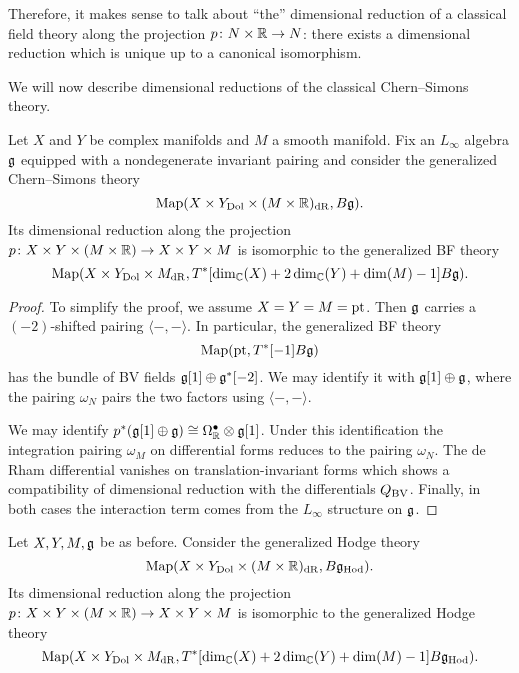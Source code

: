 \documentclass[10pt, oneside]{article}
\newcommand{\Hod}{\mathrm{Hod}}
\begin{document}
\begin{remark}
Therefore, it makes sense to talk about ``the'' dimensional reduction of a classical field theory along the projection $p \colon N \times \mathbb R \to N$: there exists a dimensional reduction which is unique up to a canonical isomorphism.
\end{remark}

We will now describe dimensional reductions of the classical Chern--Simons theory.

\begin{prop} \label{CS_to_BF_diml_red_prop}
Let $X$ and $Y$ be complex manifolds and $M$ a smooth manifold. Fix an $L_\infty$ algebra $\mathfrak g$ equipped with a nondegenerate invariant pairing and consider the generalized Chern--Simons theory
\[\operatorname{Map}(X\times Y_{\mathrm{Dol}}\times (M\times \mathbb R)_{\mathrm{dR}}, B\mathfrak g).\]
Its dimensional reduction along the projection $p\colon X\times Y\times (M\times \mathbb R)\rightarrow X\times Y\times M$ is isomorphic to the generalized BF theory
\[\operatorname{Map}(X\times Y_{\mathrm{Dol}}\times M_{\mathrm{dR}}, T^*[\dim_\mathbb C(X) + 2\dim_\mathbb C(Y) + \dim(M) - 1] B\mathfrak g).\]
\end{prop}

\begin{proof}
To simplify the proof, we assume $X=Y=M=\operatorname{pt}$. Then $\mathfrak g$ carries a $(-2)$-shifted pairing $\langle-,-\rangle$. In particular, the generalized BF theory
\[\operatorname{Map}(\operatorname{pt}, T^*[-1] B \mathfrak g)\]
has the bundle of BV fields $\mathfrak g[1] \oplus \mathfrak g^*[-2]$. We may identify it with $\mathfrak g[1]\oplus \mathfrak g$, where the pairing $\omega_N$ pairs the two factors using $\langle-,-\rangle$.

We may identify $p^*(\mathfrak g[1]\oplus \mathfrak g)\cong \Omega^\bullet_{\mathbb R}\otimes \mathfrak g[1]$. Under this identification the integration pairing $\omega_M$ on differential forms reduces to the pairing $\omega_N$. The de Rham differential vanishes on translation-invariant forms which shows a compatibility of dimensional reduction with the differentials $Q_{\mathrm{BV}}$. Finally, in both cases the interaction term comes from the $L_\infty$ structure on $\mathfrak g$.
\end{proof}

\begin{cor}
Let $X, Y, M, \mathfrak g$ be as before. Consider the generalized Hodge theory
\[\map(X\times Y_{\mr{Dol}}\times (M\times\RR)_{\mr{dR}}, B\fg_\Hod).\]
Its dimensional reduction along the projection $p\colon X\times Y\times (M\times \mathbb R)\rightarrow X\times Y\times M$ is isomorphic to the generalized Hodge theory
\[\map(X\times Y_{\mr{Dol}}\times M_{\mr{dR}}, T^*[\dim_\CC(X) + 2\dim_\CC(Y) + \dim(M) - 1] B\fg_\Hod).\]
\label{cor:Hodgetopologicalreduction}
\end{cor}
\end{document}

